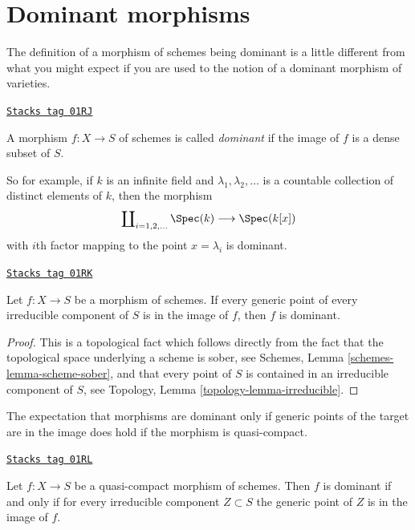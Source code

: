 \section{Dominant morphisms}
\label{morphisms-section-dominant}
The definition of a morphism of schemes being dominant is a little
different from what you might expect if you are used to the notion
of a dominant morphism of varieties.

\begin{definition}[Dominant]
\label{morphisms-definition-dominant}
\href{https://stacks.math.columbia.edu/tag/01RJ}{\texttt{Stacks tag 01RJ}}

A morphism $f : X \to S$ of schemes is called {\it dominant} if the
image of $f$ is a dense subset of $S$.
\end{definition}

So for example, if $k$ is an infinite field and $\lambda_1, \lambda_2, \ldots$
is a countable collection of distinct elements of $k$, then the morphism
$$
\coprod\nolimits_{i = 1, 2, \ldots } \Spec(k)
\longrightarrow
\Spec(k[x])
$$
with $i$th factor mapping to the point $x = \lambda_i$ is dominant.

\begin{lemma}
\label{morphisms-lemma-generic-points-in-image-dominant}
\href{https://stacks.math.columbia.edu/tag/01RK}{\texttt{Stacks tag 01RK}}

Let $f : X \to S$ be a morphism of schemes.
If every generic point of every irreducible component of $S$
is in the image of $f$, then $f$ is dominant.
\end{lemma}

\begin{proof}
This is a topological fact which follows directly from the fact that
the topological space underlying a scheme is sober, see
Schemes, Lemma \ref{schemes-lemma-scheme-sober}, and that
every point of $S$ is contained in an irreducible component of
$S$, see Topology, Lemma \ref{topology-lemma-irreducible}.
\end{proof}

The expectation that morphisms are dominant only if generic points of the
target are in the image does hold if the morphism is quasi-compact.

\begin{lemma}
\label{morphisms-lemma-quasi-compact-dominant}
\href{https://stacks.math.columbia.edu/tag/01RL}{\texttt{Stacks tag 01RL}}


Let $f : X \to S$ be a quasi-compact morphism of schemes.
Then $f$ is dominant if and only if for every irreducible
component $Z \subset S$ the generic point of $Z$ is in the
image of $f$.
\end{lemma}

